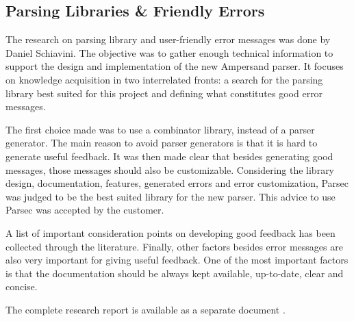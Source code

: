 

\subsection{Parsing Libraries \& Friendly Errors}
\label{domain:parsing}
The research on parsing library and user-friendly error messages was done by Daniel Schiavini.
The objective was to gather enough technical information to support the design and implementation of the new Ampersand parser.
It focuses on knowledge acquisition in two interrelated fronts: a search for the parsing library best suited for this project and defining what constitutes good error messages.

The first choice made was to use a combinator library, instead of a parser generator.
The main reason to avoid parser generators is that it is hard to generate useful feedback.
It was then made clear that besides generating good messages, those messages should also be customizable.
Considering the library design, documentation, features, generated errors and error customization, Parsec was judged to be the best suited library for the new parser.
This advice to use Parsec was accepted by the customer.

A list of important consideration points on developing good feedback has been collected through the literature.
Finally, other factors besides error messages are also very important for giving useful feedback.
One of the most important factors is that the documentation should be always kept available, up-to-date, clear and concise.

The complete research report is available as a separate document .
